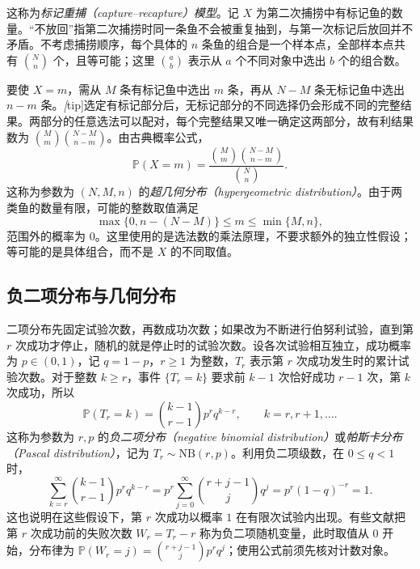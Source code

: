 \begin{solve}
这称为\emph{标记重捕（capture--recapture）模型}。记 $X$ 为第二次捕捞中有标记鱼的数量。“不放回”指第二次捕捞时同一条鱼不会被重复抽到，与第一次标记后放回并不矛盾。不考虑捕捞顺序，每个具体的 $n$ 条鱼的组合是一个样本点，全部样本点共有 $\binom Nn$ 个，且等可能；这里 $\binom ab$ 表示从 $a$ 个不同对象中选出 $b$ 个的组合数。

要使 $X=m$，需从 $M$ 条有标记鱼中选出 $m$ 条，再从 $N-M$ 条无标记鱼中选出 $n-m$ 条。\emph[tip]{选定有标记部分后，无标记部分的不同选择仍会形成不同的完整结果。}两部分的任意选法可以配对，每个完整结果又唯一确定这两部分，故有利结果数为 $\binom Mm\binom{N-M}{n-m}$。由古典概率公式，
\begin{equation}
  \mathbb P(X=m)=\frac{\binom Mm\binom{N-M}{n-m}}{\binom Nn}.
  \label{eq:study-hypergeometric-mass}
\end{equation}
这称为参数为 $(N,M,n)$ 的\emph{超几何分布（hypergeometric distribution）}。由于两类鱼的数量有限，可能的整数取值满足
\begin{equation}
  \max\{0,n-(N-M)\}\le m\le\min\{M,n\},
  \label{eq:study-hypergeometric-support}
\end{equation}
范围外的概率为 $0$。这里使用的是选法数的乘法原理，不要求额外的独立性假设；等可能的是具体组合，而不是 $X$ 的不同取值。
\end{solve}

\subsection{负二项分布与几何分布}
\label{subsec:study-negative-binomial-geometric}

二项分布先固定试验次数，再数成功次数；如果改为不断进行伯努利试验，直到第 $r$ 次成功才停止，随机的就是停止时的试验次数。设各次试验相互独立，成功概率为 $p\in(0,1)$，记 $q=1-p$，$r\ge1$ 为整数，$T_r$ 表示第 $r$ 次成功发生时的累计试验次数。对于整数 $k\ge r$，事件 $\{T_r=k\}$ 要求前 $k-1$ 次恰好成功 $r-1$ 次，第 $k$ 次成功，所以
\begin{equation}
  \mathbb P(T_r=k)=\binom{k-1}{r-1}p^rq^{k-r},
  \qquad k=r,r+1,\ldots.
  \label{eq:study-negative-binomial-mass}
\end{equation}
这称为参数为 $r,p$ 的\emph{负二项分布（negative binomial distribution）}或\emph{帕斯卡分布（Pascal distribution）}，记为 $T_r\sim\mathrm{NB}(r,p)$。利用负二项级数，在 $0\le q<1$ 时，
\[
  \sum_{k=r}^{\infty}\binom{k-1}{r-1}p^rq^{k-r}
  =p^r\sum_{j=0}^{\infty}\binom{r+j-1}{j}q^j
  =p^r(1-q)^{-r}=1.
\]
这也说明在这些假设下，第 $r$ 次成功以概率 $1$ 在有限次试验内出现。有些文献把第 $r$ 次成功前的失败次数 $W_r=T_r-r$ 称为负二项随机变量，此时取值从 $0$ 开始，分布律为 $\mathbb P(W_r=j)=\binom{r+j-1}{j}p^rq^j$；使用公式前须先核对计数对象。

